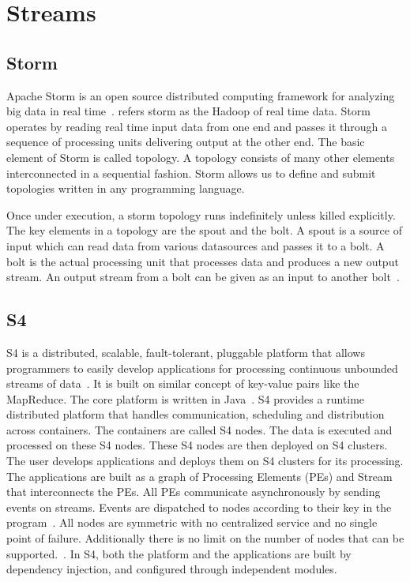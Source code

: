 \section{Streams}
\label{S:o-streams}

\subsection{Storm}

Apache Storm is an open source distributed computing framework for
analyzing big data in real time~\cite{storm-paper-IJCTT}. refers storm
as the Hadoop of real time data. Storm operates by reading real time
input data from one end and passes it through a sequence of processing
units delivering output at the other end. The basic element of Storm
is called topology. A topology consists of many other elements
interconnected in a sequential fashion. Storm allows us to define and
submit topologies written in any programming language.

Once under execution, a storm topology runs indefinitely unless killed
explicitly. The key elements in a topology are the spout and the
bolt. A spout is a source of input which can read data from various
datasources and passes it to a bolt. A bolt is the actual processing
unit that processes data and produces a new output stream. An output
stream from a bolt can be given as an input to another
bolt~\cite{www-storm-home-concepts}.
     
\subsection{S4}


S4 is a distributed, scalable, fault-tolerant, pluggable platform that
allows programmers to easily develop applications for processing
continuous unbounded streams of data~\cite{www-s4}. It is built on
similar concept of key-value pairs like the MapReduce. The core
platform is written in Java~\cite{www-s4-overview}. S4 provides a
runtime distributed platform that handles communication, scheduling
and distribution across containers. The containers are called S4
nodes. The data is executed and processed on these S4 nodes. These S4
nodes are then deployed on S4 clusters. The user develops applications
and deploys them on S4 clusters for its processing. The applications
are built as a graph of Processing Elements (PEs) and Stream that
interconnects the PEs. All PEs communicate asynchronously by sending
events on streams. Events are dispatched to nodes according to their
key in the program~\cite{www-s4}. All nodes are symmetric with no
centralized service and no single point of failure. Additionally there
is no limit on the number of nodes that can be
supported.~\cite{www-wiki-s4}. In S4, both the platform and the
applications are built by dependency injection, and configured through
independent modules.

